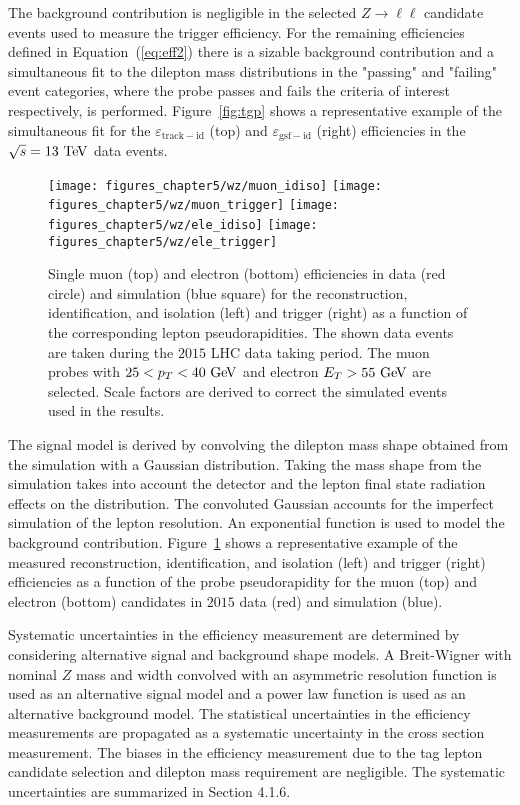 The background contribution is negligible in the selected $Z \rightarrow \ell\ell$ candidate events used to measure the trigger efficiency. For the remaining efficiencies defined in Equation~(\ref{eq:eff2}) there is a sizable background contribution and a simultaneous fit to the dilepton mass distributions in the "passing" and "failing" event categories, where the probe passes and fails the criteria of interest respectively, is performed. Figure~\ref{fig:tgp} shows a representative example of the simultaneous fit for the $\varepsilon_{\mathrm{track-id}}$ (top) and $\varepsilon_{\mathrm{gsf-id}}$ (right) efficiencies in the $\sqrt{s}=13~\mathrm{Te\kern -0.1em V}$ data events.     
\begin{figure}[htbp]
\centering
\texttt{[image: figures\_chapter5/wz/muon\_idiso]}
\texttt{[image: figures\_chapter5/wz/muon\_trigger]}
\texttt{[image: figures\_chapter5/wz/ele\_idiso]}
\texttt{[image: figures\_chapter5/wz/ele\_trigger]}
\caption{Single muon (top) and electron (bottom) efficiencies in data (red circle) and simulation (blue square) for the reconstruction, identification, and isolation (left) and trigger (right) as a function of the corresponding lepton pseudorapidities. The shown data events are taken during the $2015$ LHC data taking period. The muon probes with $25<p_{T}<40~\mathrm{Ge\kern -0.1em V}$ and electron $E_{T}>55~\mathrm{Ge\kern -0.1em V}$ are selected. Scale factors are derived to correct the simulated events used in the results.}
\label{fig:eff_fit}
\end{figure}
The signal model is derived by convolving the dilepton mass shape obtained from the simulation with a Gaussian distribution. Taking the mass shape from the simulation takes into account the detector and the lepton final state radiation effects on the distribution. The convoluted Gaussian accounts for the imperfect simulation of the lepton resolution. An exponential function is used to model the background contribution. Figure~\ref{fig:eff_fit} shows a representative example of the measured reconstruction, identification, and isolation (left) and trigger (right) efficiencies as a function of the probe pseudorapidity for the muon (top) and electron (bottom) candidates in $2015$ data (red) and simulation (blue).

Systematic uncertainties in the efficiency measurement are determined by considering alternative signal and background shape models. A Breit-Wigner with nominal $Z$ mass and width convolved with an asymmetric resolution function is used as an alternative signal model and a power law function is used as an alternative background model. The statistical uncertainties in the efficiency measurements are propagated as a systematic uncertainty in the cross section measurement. The biases in the efficiency measurement due to the tag lepton candidate selection and dilepton mass requirement are negligible. The systematic uncertainties are summarized in Section 4.1.6.    

